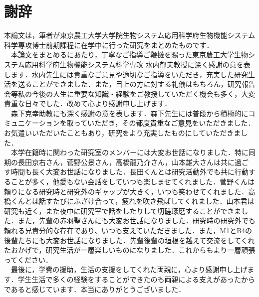 \chapter*{謝辞}
本論文は，筆者が東京農工大学大学院生物システム応用科学府生物機能システム科学専攻博士前期課程に在学中に行った研究をまとめたものです．\\
　本論文をまとめるにあたり，丁寧なご指導ご鞭撻を賜った東京農工大学生物システム応用科学府生物機能システム科学専攻 水内郁夫教授に深く感謝の意を表します．水内先生には貴重なご意見や適切なご指導をいただき，充実した研究生活を送ることができました．また，目上の方に対する礼儀はもちろん，研究報告会等私の今後の人生に重要な知識・経験をご教授していただく機会も多く，大変貴重な日々でした．改めて心より感謝申し上げます．\\
　森下克幸助教にも深く感謝の意を表します．森下先生には普段から積極的にコミュニケーションを取っていただき，その都度貴重なご意見をいただきました．お気遣いいただいたこともあり，研究をより充実したものにしていただきました．\\
　本学在籍時に関わった研究室のメンバーには大変お世話になりました．特に同期の長田京右さん，菅野公景さん，高橋龍乃介さん，山本雄大さんは共に過ごす時間も長く大変お世話になりました．長田くんとは研究活動外でも共に行動することが多く，他愛もない会話をしていつも楽しませてくれました．菅野くんは頼りになる研究時と研究外のギャップが大きく，いつも笑わせてくれました．高橋くんとは話すたびにふざけ合って，疲れを吹き飛ばしてくれました．山本君は研究も近く，また夜中に研究室で話をしたりして切磋琢磨することができました．また，先輩の赤羽聖さんにも大変お世話になりました．研究時の研究外でも頼れる兄貴分的な存在であり、いつも支えていただきました．また，M1とB4の後輩たちにも大変お世話になりました．先輩後輩の垣根を越えて交流をしてくれたおかげで，研究生活が一層楽しいものになりました．これからもより一層頑張ってください．\\
　最後に，学費の援助，生活の支援をしてくれた両親に，心より感謝申し上げます．学生生活で多くの経験をすることができたのも両親による支えがあったからであると感じています．本当にありがとうございました．

